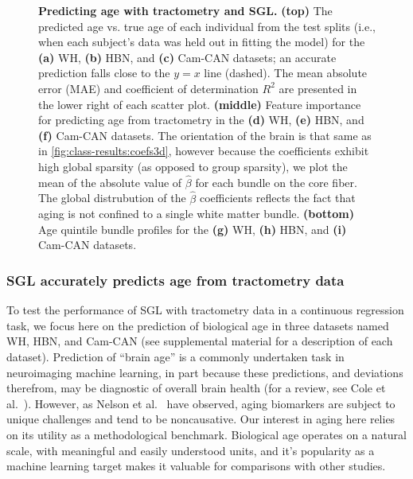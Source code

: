 \documentclass[10pt,%
               aps,%
               prl,%
               reprint,%
               superscriptaddress,%
               preprintnumbers,%
               linenumbers,%
               amsmath,%
               floatfix]{revtex4-1}
\begin{document}
\begin{figure}
    {\label{fig:age-results:wh-scatter}}
    {\label{fig:age-results:hbn-scatter}}
    {\label{fig:age-results:cc-scatter}}
    {\label{fig:age-results:wh-coefs3d}}
    {\label{fig:age-results:hbn-coefs3d}}
    {\label{fig:age-results:cc-coefs3d}}
    {\label{fig:age-results:wh-profile}}
    {\label{fig:age-results:hbn-profile}}
    {\label{fig:age-results:cc-profile}}
    \caption{%
        {\bf Predicting age with tractometry and SGL.}
        \label{fig:age-results}
        {\bf (top)} The predicted age vs. true age of each individual from the test
        splits (i.e., when each subject's data was held out in fitting the
        model) for the {\bf (a)} WH, {\bf (b)} HBN, and {\bf (c)} Cam-CAN
        datasets; an accurate prediction falls close to the $y=x$ line
        (dashed). The mean absolute error (MAE) and coefficient of
        determination $R^2$ are presented in the lower right of each scatter
        plot.
        {\bf (middle)} Feature importance for predicting age from tractometry in
        the {\bf (d)} WH, {\bf (e)} HBN, and {\bf (f)} Cam-CAN datasets.
        The orientation of the
        brain is that same as in \cref{fig:class-results:coefs3d}, however because
        the coefficients exhibit high global sparsity (as opposed to group
        sparsity), we plot the mean of the absolute value of $\hat{\beta}$
        for each bundle on the core fiber. The global distrubution of the
        $\hat{\beta}$ coefficients reflects the fact that aging is not
        confined to a single white matter bundle.
        {\bf (bottom)} Age quintile bundle profiles for the {\bf (g)} WH,
        {\bf (h)} HBN, and {\bf (i)} Cam-CAN datasets.
    }
\end{figure}

\subsubsection*{SGL accurately predicts age from tractometry data}

To test the performance of SGL with tractometry data in a continuous
regression task, we focus here on the prediction of biological age in three
datasets named WH, HBN, and Cam-CAN (see supplemental material
\cite{supplement} for a description of each dataset). Prediction of ``brain
age'' is a commonly undertaken task in neuroimaging machine learning, in part
because these predictions, and deviations therefrom, may be diagnostic of
overall brain health (for a review, see Cole et al.~\cite{Cole2019-rz}).
However, as Nelson et al.~\cite{nelson2019biomarkers} have observed, aging
biomarkers are subject to unique challenges and tend to be noncausative. Our
interest in aging here relies on its utility as a methodological benchmark.
Biological age operates on a natural scale, with meaningful and easily
understood units, and it's popularity as a machine learning target makes it
valuable for comparisons with other studies.
\end{document}
